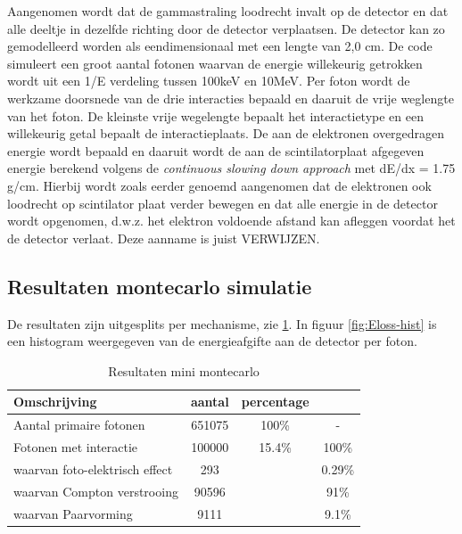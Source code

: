 \documentclass[a4paper,11pt]{article}
\begin{document}
Aangenomen wordt dat de gammastraling loodrecht invalt op de detector en dat alle deeltje in dezelfde richting door de detector verplaatsen. De detector kan zo gemodelleerd worden als eendimensionaal met een lengte van 2,0 cm. De code simuleert een groot aantal fotonen waarvan de energie willekeurig getrokken wordt uit een 1/E verdeling tussen 100keV en 10MeV. Per foton wordt de werkzame doorsnede van de drie interacties bepaald en daaruit de vrije weglengte van het foton. De kleinste vrije wegelengte bepaalt het interactietype en een willekeurig getal bepaalt de interactieplaats. De aan de elektronen overgedragen energie wordt bepaald en daaruit wordt de aan de scintilatorplaat afgegeven energie berekend volgens de \textit{continuous slowing down approach} met dE/dx = 1.75 g/cm. Hierbij wordt zoals eerder genoemd aangenomen dat de elektronen ook loodrecht op scintilator plaat verder bewegen en dat alle energie in de detector wordt opgenomen, d.w.z. het elektron voldoende afstand kan afleggen voordat het de detector verlaat. Deze aanname is juist VERWIJZEN.

\subsection{Resultaten montecarlo simulatie}

De resultaten zijn uitgesplits per mechanisme, zie \ref{table:mmc-mechanisme}.
In figuur \ref{fig:Eloss-hist} is een histogram weergegeven van de energieafgifte aan de detector per foton.

\begin{table}[ht]
\caption{Resultaten mini montecarlo}
\centering
\begin{tabular}{l c c c} %
\hline\hline
Omschrijving & aantal & percentage \\ [0.5ex] %
\hline %
Aantal primaire fotonen & 651075 & 100\% & - \\ %
Fotonen met interactie & 100000 & 15.4\% & 100\% \\
waarvan foto-elektrisch effect & 293 & & 0.29\% \\
waarvan Compton verstrooing & 90596 & & 91\% \\
waarvan Paarvorming & 9111 & & 9.1\% \\ [1ex] %
\hline %
\end{tabular}
\label{table:mmc-mechanisme} %
\end{table}
\end{document}
